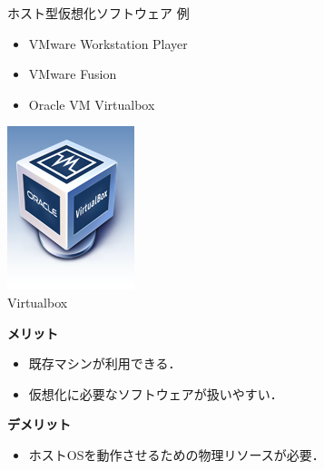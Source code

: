 \begin{frame}[t]{\ftitle}
    \begin{exampleblock}{ホスト型仮想化ソフトウェア 例}
        \begin{minipage}[b]{.8\textwidth}
            \begin{itemize}
                \setlength{\itemsep}{1em}
                \item VMware Workstation Player
                \item VMware Fusion
                \item Oracle VM Virtualbox
            \end{itemize}
        \end{minipage}
        \begin{minipage}[b]{.15\textwidth}
            \centering
            \includegraphics[keepaspectratio,width=.8\textwidth]{virtualbox_logo.png}\\
            {\tiny Virtualbox\cite{VMBox}}
        \end{minipage}
    \end{exampleblock}
    \begin{minipage}[t]{.48\textwidth}
        \textbf{\cmark メリット}
        \begin{itemize}
            \item 既存マシンが利用できる．
            \item 仮想化に必要なソフトウェアが扱いやすい．
        \end{itemize}
    \end{minipage}
    \begin{minipage}[t]{.48\textwidth}
        \textbf{\xmark デメリット}
        \begin{itemize}
            \item ホストOSを動作させるための物理リソースが必要．
        \end{itemize}
    \end{minipage}\\
    \hfill\cite{itmanage}
\end{frame}

